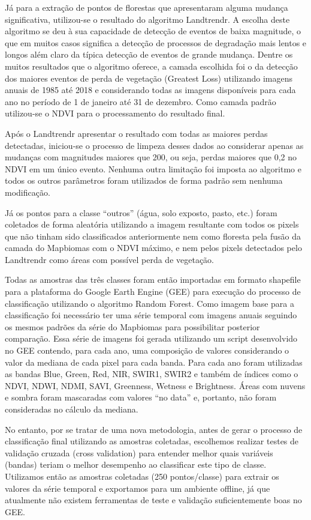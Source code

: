 \documentclass[12pt,a4paper]{article}
\begin{document}
Já para a extração de pontos de florestas que apresentaram alguma mudança significativa, utilizou-se o resultado do algoritmo Landtrendr. A escolha deste algoritmo se deu à sua capacidade de detecção de eventos de baixa magnitude, o que em muitos casos significa a detecção de processos de degradação mais lentos e longos além claro da típica detecção de eventos de grande mudança. Dentre os muitos resultados que o algoritmo oferece, a camada escolhida foi o da detecção dos maiores eventos de perda de vegetação (Greatest Loss) utilizando imagens anuais de 1985 até 2018 e considerando todas as imagens disponíveis para cada ano no período de 1 de janeiro até 31 de dezembro. Como camada padrão utilizou-se o NDVI para o processamento do resultado final.

Após o Landtrendr apresentar o resultado com todas as maiores perdas detectadas, iniciou-se o processo de limpeza desses dados ao considerar apenas as mudanças com magnitudes maiores que 200, ou seja, perdas maiores que 0,2 no NDVI em um único evento. Nenhuma outra limitação foi imposta ao algoritmo e todos os outros parâmetros foram utilizados de forma padrão sem nenhuma modificação.

Já os pontos para a classe “outros” (água, solo exposto, pasto, etc.) foram coletados de forma aleatória utilizando a imagem resultante com todos os pixels que não tinham sido classificados anteriormente nem como floresta pela fusão da camada do Mapbiomas com o NDVI máximo, e nem pelos pixels detectados pelo Landtrendr como áreas com possível perda de vegetação.

Todas as amostras das três classes foram então importadas em formato shapefile para a plataforma do Google Earth Engine (GEE) para execução do processo de classificação utilizando o algoritmo Random Forest. Como imagem base para a classificação foi necessário ter uma série temporal com imagens anuais seguindo os mesmos padrões da série do Mapbiomas para possibilitar posterior comparação. Essa série de imagens foi gerada utilizando um script desenvolvido no GEE contendo, para cada ano, uma composição de valores considerando o valor da mediana de cada pixel para cada banda. Para cada ano foram utilizadas as bandas Blue, Green, Red, NIR, SWIR1, SWIR2 e também de índices como o NDVI, NDWI, NDMI, SAVI, Greenness, Wetness e Brightness. Áreas com nuvens e sombra foram mascaradas com valores “no data” e, portanto, não foram consideradas no cálculo da mediana.

No entanto, por se tratar de uma nova metodologia, antes de gerar o processo de classificação final utilizando as amostras coletadas, escolhemos realizar testes de validação cruzada (cross validation) para entender melhor quais variáveis (bandas) teriam o melhor desempenho ao classificar este tipo de classe. Utilizamos então as amostras coletadas (250 pontos/classe) para extrair os valores da série temporal e exportamos para um ambiente offline, já que atualmente não existem ferramentas de teste e validação suficientemente boas no GEE.
\end{document}
